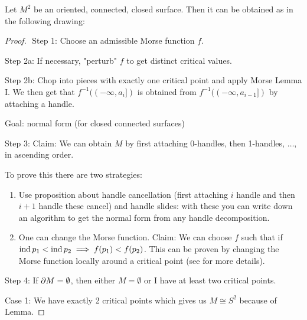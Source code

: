\begin{thm}\label{Classification of 2d manifolds}
    Let $M^2$ be an oriented, connected, closed surface. Then it can be obtained as in the following drawing:
\end{thm}


\begin{proof}
$ $ \newline  %
    \indent Step 1: Choose an admissible Morse function $f$.
    
    Step 2a: If necessary, "perturb" $f$ to get distinct critical values. %

    Step 2b: Chop into pieces with exactly one critical point and apply Morse Lemma I. We then get that $f^{-1}((-\infty, a_i])$ is obtained from $f^{-1}((-\infty,a_{i-1}])$ by attaching a handle.

    Goal: normal form (for closed connected surfaces) %

    Step 3: Claim: We can obtain $M$ by first attaching 0-handles, then 1-handles, $\dots$, in ascending order.

    To prove this there are two strategies:
    \begin{enumerate}
        \item Use proposition about handle cancellation (first attaching $i$ handle and then $i+1$ handle these cancel) and handle slides: %
        with these you can write down an algorithm to get the normal form from any handle decomposition.
        \item One can change the Morse function. Claim: We can choose $f$ such that if $\operatorname{ind} p_1 < \operatorname{ind} p_2 \implies f(p_1) < f(p_2)$. %
        This can be proven by changing the Morse function locally around a critical point (see \cite{Hirsch1976} for more details). %
    \end{enumerate}

    Step 4: If $\partial M = \emptyset$, then either $M = \emptyset$ or I have at least two critical points.

    \noindent Case 1: We have exactly 2 critical points which gives us $M \cong S^2$ because of Lemma. %


\end{proof}
